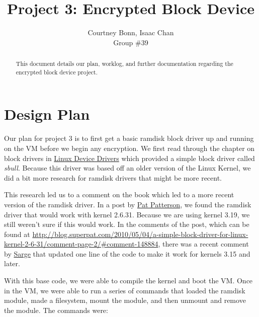 \documentclass[letterpaper,10pt,draftclsnofoot,onecolumn,titlepage]{IEEEtran}
\def\name{Courtney Bonn, Isaac Chan}
\def\grp{Group \#39}
\begin{document}
\title{Project 3: Encrypted Block Device}
\author{\name \\ \grp}

\maketitle

\begin{abstract}
   This document details our plan, worklog, and further documentation regarding the encrypted block device project.
\end{abstract}

\section{Design Plan}
Our plan for project 3 is to first get a basic ramdisk block driver up and running on the VM before we begin any encryption. 
We first read through the chapter on block drivers in \href{https://lwn.net/Kernel/LDD3/}{Linux Device Drivers} which provided a simple block driver called \textit{sbull}. 
Because this driver was based off an older version of the Linux Kernel, we did a bit more research for ramdisk drivers that might be more recent. 

This research led us to a comment on the book which led to a more recent version of the ramdisk driver. 
In a post by \href{http://blog.superpat.com/2010/05/04/a-simple-block-driver-for-linux-kernel-2-6-31/comment-page-2/#comment-148884}{Pat Patterson}, we found the ramdisk driver that would work with kernel 2.6.31. 
Because we are using kernel 3.19, we still weren't sure if this would work. 
In the comments of the post, which can be found at \url{http://blog.superpat.com/2010/05/04/a-simple-block-driver-for-linux-kernel-2-6-31/comment-page-2/#comment-148884}, there was a recent comment by \href{http://blog.superpat.com/2010/05/04/a-simple-block-driver-for-linux-kernel-2-6-31/comment-page-2/#comment-148884}{Sarge} that updated one line of the code to make it work for kernels 3.15 and later.  

With this base code, we were able to compile the kernel and boot the VM. 
Once in the VM, we were able to run a series of commands that loaded the ramdisk module, made a filesystem, mount the module, and then unmount and remove the module. The commands were:
\end{document}
